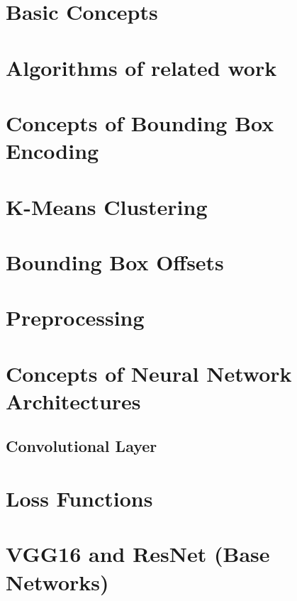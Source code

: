 \appendix

\section{Basic Concepts}
\blindtext[1]

\section{Algorithms of related work}
\blindtext[2]

\section{Concepts of Bounding Box Encoding}\label{append:Concepts of Bounding Box Encoding}
\blindtext[3]



\section{K-Means Clustering}\label{append:K-Means Clustering}
\blindtext[3]%
\section{Bounding Box Offsets}
\blindtext[1]

\section{Preprocessing}
\blindtext[3]

\section{Concepts of Neural Network Architectures}
\blindtext[3]
\subsection{Convolutional Layer}\label{append:Convolutional Layer}
\blindtext[1]
\blindtext[3]

\section{Loss Functions}
\blindtext[2]

\section{VGG16 and ResNet (Base Networks)}
\blindtext[3]


